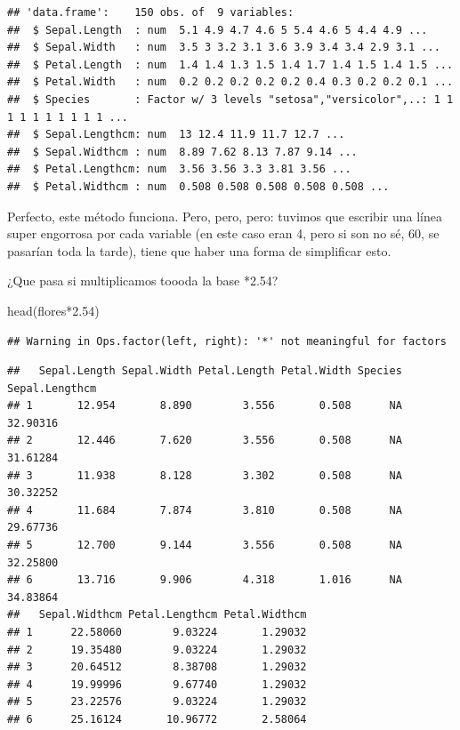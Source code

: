 \documentclass[
]{book}
\newenvironment{Shaded}{\begin{snugshade}}{\end{snugshade}}
\newcommand{\FloatTok}[1]{\textcolor[rgb]{0.00,0.00,0.81}{#1}}
\newcommand{\FunctionTok}[1]{\textcolor[rgb]{0.00,0.00,0.00}{#1}}
\newcommand{\NormalTok}[1]{#1}
\newcommand{\SpecialCharTok}[1]{\textcolor[rgb]{0.00,0.00,0.00}{#1}}
\begin{document}
\begin{verbatim}
## 'data.frame':    150 obs. of  9 variables:
##  $ Sepal.Length  : num  5.1 4.9 4.7 4.6 5 5.4 4.6 5 4.4 4.9 ...
##  $ Sepal.Width   : num  3.5 3 3.2 3.1 3.6 3.9 3.4 3.4 2.9 3.1 ...
##  $ Petal.Length  : num  1.4 1.4 1.3 1.5 1.4 1.7 1.4 1.5 1.4 1.5 ...
##  $ Petal.Width   : num  0.2 0.2 0.2 0.2 0.2 0.4 0.3 0.2 0.2 0.1 ...
##  $ Species       : Factor w/ 3 levels "setosa","versicolor",..: 1 1 1 1 1 1 1 1 1 1 ...
##  $ Sepal.Lengthcm: num  13 12.4 11.9 11.7 12.7 ...
##  $ Sepal.Widthcm : num  8.89 7.62 8.13 7.87 9.14 ...
##  $ Petal.Lengthcm: num  3.56 3.56 3.3 3.81 3.56 ...
##  $ Petal.Widthcm : num  0.508 0.508 0.508 0.508 0.508 ...
\end{verbatim}

Perfecto, este método funciona. Pero, pero, pero: tuvimos que escribir una línea super engorrosa por cada variable (en este caso eran 4, pero si son no sé, 60, se pasarían toda la tarde), tiene que haber una forma de simplificar esto.

¿Que pasa si multiplicamos toooda la base *2.54?

\begin{Shaded}
\begin{Highlighting}[]
\FunctionTok{head}\NormalTok{(flores}\SpecialCharTok{*}\FloatTok{2.54}\NormalTok{)}
\end{Highlighting}
\end{Shaded}

\begin{verbatim}
## Warning in Ops.factor(left, right): '*' not meaningful for factors
\end{verbatim}

\begin{verbatim}
##   Sepal.Length Sepal.Width Petal.Length Petal.Width Species Sepal.Lengthcm
## 1       12.954       8.890        3.556       0.508      NA       32.90316
## 2       12.446       7.620        3.556       0.508      NA       31.61284
## 3       11.938       8.128        3.302       0.508      NA       30.32252
## 4       11.684       7.874        3.810       0.508      NA       29.67736
## 5       12.700       9.144        3.556       0.508      NA       32.25800
## 6       13.716       9.906        4.318       1.016      NA       34.83864
##   Sepal.Widthcm Petal.Lengthcm Petal.Widthcm
## 1      22.58060        9.03224       1.29032
## 2      19.35480        9.03224       1.29032
## 3      20.64512        8.38708       1.29032
## 4      19.99996        9.67740       1.29032
## 5      23.22576        9.03224       1.29032
## 6      25.16124       10.96772       2.58064
\end{verbatim}
\end{document}
